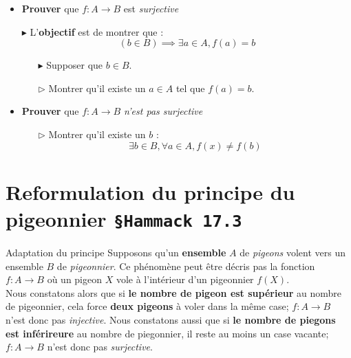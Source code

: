 \documentclass[16pt]{report}
\begin{document}
\begin{multicols*}{2}
\begin{itemize}
            \item \textbf{Prouver} que  $f : A \rightarrow B$ est \textit{surjective}   
                    \item[$\blacktriangleright$] L'\textbf{objectif} est de montrer que : 
                        \[ (b \in B) \implies \exists a \in A, f(a) = b \]
                \begin{enumerate}
                    \item[$\blacktriangleright$] Supposer que $b \in B$. 
                    \item[$\rhd$] Montrer qu'il existe un $a \in A$ tel que 
                        $f(a) = b$. 
                \end{enumerate}

            \item \textbf{Prouver} que $f : A \rightarrow  B$ \textit{n'est pas surjective}    
                \begin{enumerate}
                    \item[$\rhd$] Montrer qu'il existe un $b$ : 
                        \[\exists b \in B, \forall a \in A, f(x) \neq f(b)\]  
                \end{enumerate}
        \end{itemize}           


        \section{Reformulation du principe du pigeonnier \texttt{\small{\S Hammack 17.3}}}


            \begin{Concept}{Adaptation du principe}{}
                Supposons qu'un \textbf{ensemble} $A$ de \textit{pigeons} volent 
                vers un ensemble $B$ de \textit{pigeonnier}. Ce phénomène peut être décris pas 
                la fonction $f : A \rightarrow  B$ où un pigeon $X$ vole à l'intérieur d'un 
                pigeonnier $f(X)$. 
                \vspace{1em}
                \\
                Nous constatons alors que si \textbf{le nombre de pigeon est supérieur} au nombre de pigeonnier, 
                cela force \textbf{deux pigeons} à voler dans la même case; $f : A \rightarrow  B$ 
                n'est donc pas \textit{injective}. Nous constatons aussi que si 
                \textbf{le nombre de piegons est inférireure} 
                au nombre de piegonnier, il reste au moins un case vacante; $f : A \rightarrow  B$ n'est donc 
                pas \textit{surjective}.  
            \end{Concept}



\end{multicols*}
\end{document}
